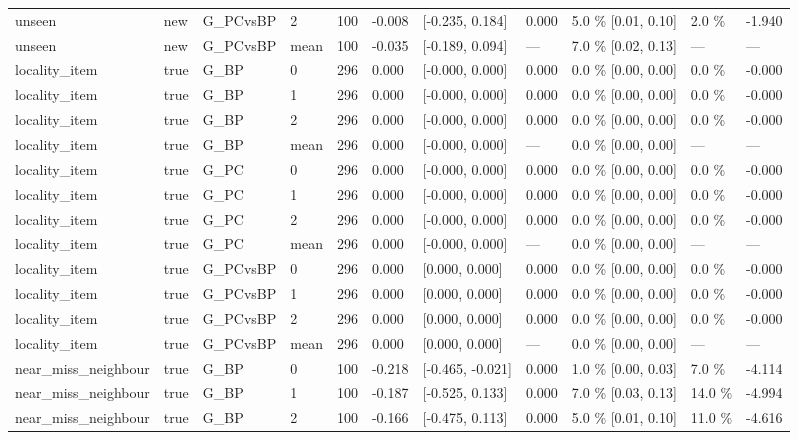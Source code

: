 \documentclass[10pt,a4paper]{article}
\begin{document}
\begin{center}
\begin{tabularx}{\textwidth}{@{}p{}XXXXXXXXXX@{}}
unseen & new & G\_PCvsBP & 2 & 100 & -0.008 & [-0.235, 0.184] & 0.000 & 5.0 \% [0.01, 0.10] & 2.0 \% & -1.940 \\
unseen & new & G\_PCvsBP & mean & 100 & -0.035 & [-0.189, 0.094] & — & 7.0 \% [0.02, 0.13] & — & — \\
locality\_item & true & G\_BP & 0 & 296 & 0.000 & [-0.000, 0.000] & 0.000 & 0.0 \% [0.00, 0.00] & 0.0 \% & -0.000 \\
locality\_item & true & G\_BP & 1 & 296 & 0.000 & [-0.000, 0.000] & 0.000 & 0.0 \% [0.00, 0.00] & 0.0 \% & -0.000 \\
locality\_item & true & G\_BP & 2 & 296 & 0.000 & [-0.000, 0.000] & 0.000 & 0.0 \% [0.00, 0.00] & 0.0 \% & -0.000 \\
locality\_item & true & G\_BP & mean & 296 & 0.000 & [-0.000, 0.000] & — & 0.0 \% [0.00, 0.00] & — & — \\
locality\_item & true & G\_PC & 0 & 296 & 0.000 & [-0.000, 0.000] & 0.000 & 0.0 \% [0.00, 0.00] & 0.0 \% & -0.000 \\
locality\_item & true & G\_PC & 1 & 296 & 0.000 & [-0.000, 0.000] & 0.000 & 0.0 \% [0.00, 0.00] & 0.0 \% & -0.000 \\
locality\_item & true & G\_PC & 2 & 296 & 0.000 & [-0.000, 0.000] & 0.000 & 0.0 \% [0.00, 0.00] & 0.0 \% & -0.000 \\
locality\_item & true & G\_PC & mean & 296 & 0.000 & [-0.000, 0.000] & — & 0.0 \% [0.00, 0.00] & — & — \\
locality\_item & true & G\_PCvsBP & 0 & 296 & 0.000 & [0.000, 0.000] & 0.000 & 0.0 \% [0.00, 0.00] & 0.0 \% & -0.000 \\
locality\_item & true & G\_PCvsBP & 1 & 296 & 0.000 & [0.000, 0.000] & 0.000 & 0.0 \% [0.00, 0.00] & 0.0 \% & -0.000 \\
locality\_item & true & G\_PCvsBP & 2 & 296 & 0.000 & [0.000, 0.000] & 0.000 & 0.0 \% [0.00, 0.00] & 0.0 \% & -0.000 \\
locality\_item & true & G\_PCvsBP & mean & 296 & 0.000 & [0.000, 0.000] & — & 0.0 \% [0.00, 0.00] & — & — \\
near\_miss\_neighbour & true & G\_BP & 0 & 100 & -0.218 & [-0.465, -0.021] & 0.000 & 1.0 \% [0.00, 0.03] & 7.0 \% & -4.114 \\
near\_miss\_neighbour & true & G\_BP & 1 & 100 & -0.187 & [-0.525, 0.133] & 0.000 & 7.0 \% [0.03, 0.13] & 14.0 \% & -4.994 \\
near\_miss\_neighbour & true & G\_BP & 2 & 100 & -0.166 & [-0.475, 0.113] & 0.000 & 5.0 \% [0.01, 0.10] & 11.0 \% & -4.616 \\

\end{tabularx}
\end{center}
\end{document}
